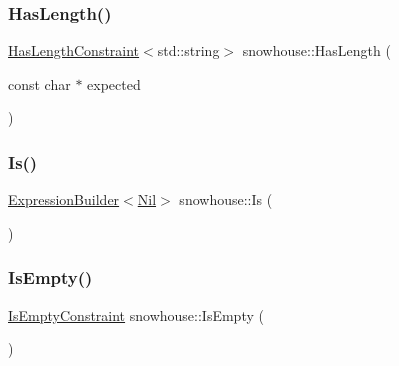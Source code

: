 \mbox{\label{namespacesnowhouse_a576ebffd6d82b5d2a3dba195e0ca7741}} 
\subsubsection{\texorpdfstring{HasLength()}{HasLength()}\hspace{0.1cm}{\footnotesize\ttfamily [2/2]}}
{\footnotesize\ttfamily \mbox{\hyperlink{structsnowhouse_1_1HasLengthConstraint}{Has\+Length\+Constraint}}$<$std\+::string$>$ snowhouse\+::\+Has\+Length (\begin{DoxyParamCaption}\item[{const char $\ast$}]{expected }\end{DoxyParamCaption})\hspace{0.3cm}{\ttfamily [inline]}}

\mbox{\label{namespacesnowhouse_a93bfe2e092fb56b6554640d669ef2ee3}} 
\subsubsection{\texorpdfstring{Is()}{Is()}}
{\footnotesize\ttfamily \mbox{\hyperlink{structsnowhouse_1_1ExpressionBuilder}{Expression\+Builder}}$<$\mbox{\hyperlink{structsnowhouse_1_1Nil}{Nil}}$>$ snowhouse\+::\+Is (\begin{DoxyParamCaption}{ }\end{DoxyParamCaption})\hspace{0.3cm}{\ttfamily [inline]}}

\mbox{\label{namespacesnowhouse_abace5291129c2c329e287fad2a8344a2}} 
\subsubsection{\texorpdfstring{IsEmpty()}{IsEmpty()}}
{\footnotesize\ttfamily \mbox{\hyperlink{structsnowhouse_1_1IsEmptyConstraint}{Is\+Empty\+Constraint}} snowhouse\+::\+Is\+Empty (\begin{DoxyParamCaption}{ }\end{DoxyParamCaption})\hspace{0.3cm}{\ttfamily [inline]}}


